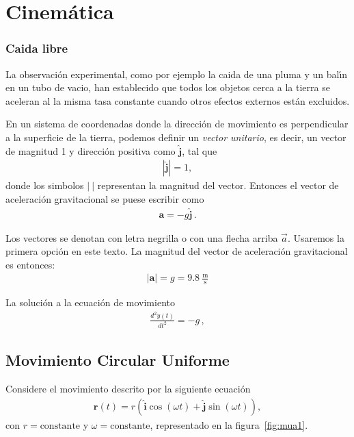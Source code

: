 
\chapter{Cinemática}
\label{chap:cin1}



\subsection{Caida libre}
La observaci\'on experimental, como por ejemplo la caida de una pluma y un bal\'\i n en un tubo de vacio, han establecido que todos los objetos cerca a la tierra se aceleran al la misma tasa constante cuando otros efectos externos est\'an excluidos.


En un sistema de coordenadas donde la direcci\'on de movimiento es perpendicular a la superficie de la tierra, podemos definir un \emph{vector unitario}, es decir, un vector de magnitud 1 y direcci\'on positiva como $\hat{\mathbf{j}}$, tal que
\begin{align}
  |\hat{\mathbf{j}}| = 1,
\end{align}
donde los simbolos $|\ |$ representan la magnitud del vector. Entonces el vector de aceleraci\'on gravitacional se puese escribir como
\begin{align}
  \mathbf{a}=-g \hat{\mathbf{j}}\,.
\end{align}

Los vectores se denotan con letra negrilla o con una flecha arriba $\vec a$. Usaremos la primera opci\'on en este texto. La magnitud del vector de aceleraci\'on gravitacional es entonces:
\begin{align}
  |\mathbf{a}|=g=9.8\ \frac{\text{m}}{\text{s}}
\end{align}

La soluci\'on a la ecuaci\'on de movimiento
\begin{align}
  \frac{d^2y(t)}{dt^2}=-g\,,
\end{align}



\section{Movimiento Circular Uniforme}

Considere el movimiento descrito por la siguiente ecuaci\'on
\begin{align}
  \label{eq:mua}
  \mathbf{r}(t)=r\left(\hat{\mathbf{i}}\cos(\omega t)+\hat{\mathbf{j}}\sin(\omega t)\right),
\end{align}
con $r=\text{constante}$ y $\omega=\text{constante}$, representado en la figura~\ref{fig:mua1}.


